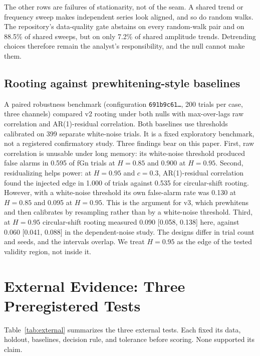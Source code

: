 \documentclass[10pt,twocolumn,letterpaper]{article}
\theoremstyle{definition}
\theoremstyle{remark}
\newcommand{\code}[1]{\texttt{#1}}
\begin{document}
The other rows are failures of stationarity, not of the seam. A shared trend or
frequency sweep makes independent series look aligned, and so do random walks.
The repository's data-quality gate abstains on every random-walk pair and on
88.5\% of shared sweeps, but on only 7.2\% of shared amplitude trends.
Detrending choices therefore remain the analyst's responsibility, and the null
cannot make them.

\subsection{Rooting against prewhitening-style baselines}

A paired robustness benchmark (configuration \code{691b9c61\ldots}, 200 trials
per case, three channels) compared v2 rooting under both nulls with
max-over-lags raw correlation and AR(1)-residual correlation. Both baselines use
thresholds calibrated on 399 separate white-noise trials. It is a fixed
exploratory benchmark, not a registered confirmatory study. Three findings bear
on this paper. First, raw correlation is unusable under long memory: its
white-noise threshold produced false alarms in 0.595 of fGn trials at $H=0.85$
and 0.900 at $H=0.95$. Second, residualizing helps power: at $H=0.95$ and
$c=0.3$, AR(1)-residual correlation found the injected edge in 1.000 of trials
against 0.535 for circular-shift rooting. However, with a white-noise threshold
its own false-alarm rate was 0.130 at $H=0.85$ and 0.095 at $H=0.95$. This is
the argument for v3, which prewhitens and then calibrates by resampling rather
than by a white-noise threshold. Third, at $H=0.95$ circular-shift rooting measured
0.090 [0.058, 0.138] here, against 0.060 [0.041, 0.088] in the dependent-noise
study. The designs differ in trial count and seeds, and the intervals overlap.
We treat $H=0.95$ as the edge of the tested validity region, not inside it.

\section{External Evidence: Three Preregistered Tests}\label{sec:external}

Table~\ref{tab:external} summarizes the three external tests. Each fixed its
data, holdout, baselines, decision rule, and tolerance before scoring. None
supported its claim.
\end{document}
